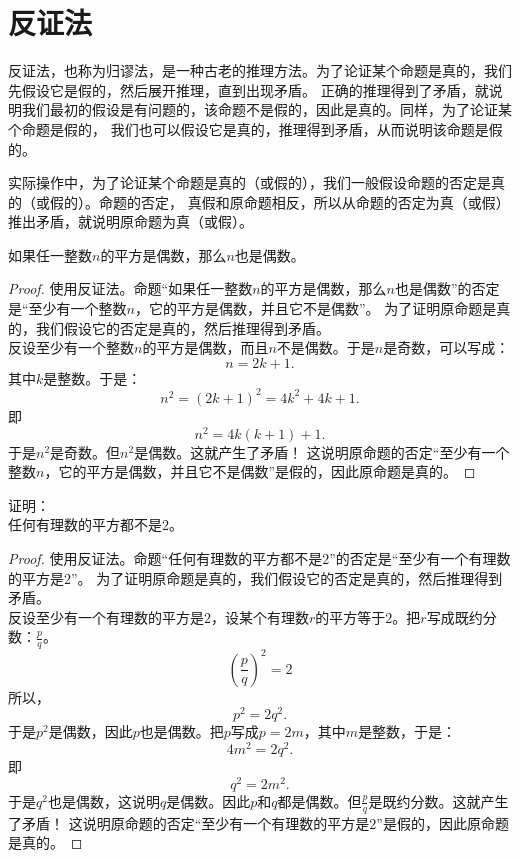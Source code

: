 \section{反证法}
反证法，也称为归谬法，是一种古老的推理方法。为了论证某个命题是真的，我们先假设它是假的，然后展开推理，直到出现矛盾。
正确的推理得到了矛盾，就说明我们最初的假设是有问题的，该命题不是假的，因此是真的。同样，为了论证某个命题是假的，
我们也可以假设它是真的，推理得到矛盾，从而说明该命题是假的。

实际操作中，为了论证某个命题是真的（或假的），我们一般假设命题的否定是真的（或假的）。命题的否定，
真假和原命题相反，所以从命题的否定为真（或假）推出矛盾，就说明原命题为真（或假）。

\begin{ex}\label{ex:2-0-0}
    如果任一整数$n$的平方是偶数，那么$n$也是偶数。
\end{ex}
\begin{proof}
    使用反证法。命题“如果任一整数$n$的平方是偶数，那么$n$也是偶数”的否定是“至少有一个整数$n$，它的平方是偶数，并且它不是偶数”。
    为了证明原命题是真的，我们假设它的否定是真的，然后推理得到矛盾。\\
    反设至少有一个整数$n$的平方是偶数，而且$n$不是偶数。于是$n$是奇数，可以写成：
    $$ n = 2k+1.$$
    其中$k$是整数。于是：
    $$ n^2 = (2k+1)^2 = 4k^2 + 4k + 1.$$
    即
    $$ n^2 = 4k(k+1)+1.$$
    于是$n^2$是奇数。但$n^2$是偶数。这就产生了矛盾！
    这说明原命题的否定“至少有一个整数$n$，它的平方是偶数，并且它不是偶数”是假的，因此原命题是真的。
\end{proof}

\begin{ex}\label{ex:2-0-1}
    证明：\\
    任何有理数的平方都不是$2$。
\end{ex}
\begin{proof}
    使用反证法。命题“任何有理数的平方都不是$2$”的否定是“至少有一个有理数的平方是$2$”。
    为了证明原命题是真的，我们假设它的否定是真的，然后推理得到矛盾。\\
    反设至少有一个有理数的平方是$2$，设某个有理数$r$的平方等于$2$。把$r$写成既约分数：$\frac{p}{q}$。
    $$ \left(\frac{p}{q}\right)^2 = 2$$
    所以，
    $$ p^2 = 2q^2.$$
    于是$p^2$是偶数，因此$p$也是偶数。把$p$写成$p = 2m$，其中$m$是整数，于是：
    $$ 4m^2 = 2q^2.$$
    即
    $$ q^2 = 2m^2.$$
    于是$q^2$也是偶数，这说明$q$是偶数。因此$p$和$q$都是偶数。但$\frac{p}{q}$是既约分数。这就产生了矛盾！
    这说明原命题的否定“至少有一个有理数的平方是$2$”是假的，因此原命题是真的。
\end{proof}

